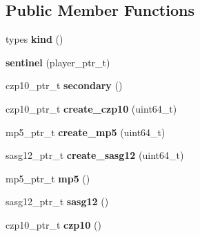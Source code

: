\subsection*{Public Member Functions}
\begin{DoxyCompactItemize}
\item 
\mbox{\label{structmods_1_1classes_1_1sentinel_a949c4bb586c1048c2e80026c322a59a9}} 
types {\bfseries kind} ()
\item 
\mbox{\label{structmods_1_1classes_1_1sentinel_afcf6f192946225af0b540fc562da2660}} 
{\bfseries sentinel} (player\+\_\+ptr\+\_\+t)
\item 
\mbox{\label{structmods_1_1classes_1_1sentinel_a57e665ac50220a0dd2d389bc1eb0948f}} 
czp10\+\_\+ptr\+\_\+t {\bfseries secondary} ()
\item 
\mbox{\label{structmods_1_1classes_1_1sentinel_a175cee9d688ecfdb24b3d4c81b0f4b18}} 
czp10\+\_\+ptr\+\_\+t {\bfseries create\+\_\+czp10} (uint64\+\_\+t)
\item 
\mbox{\label{structmods_1_1classes_1_1sentinel_a7a5172e550a00bb24743c00b903ae646}} 
mp5\+\_\+ptr\+\_\+t {\bfseries create\+\_\+mp5} (uint64\+\_\+t)
\item 
\mbox{\label{structmods_1_1classes_1_1sentinel_a7dcc49958848878b167112eae64a63f7}} 
sasg12\+\_\+ptr\+\_\+t {\bfseries create\+\_\+sasg12} (uint64\+\_\+t)
\item 
\mbox{\label{structmods_1_1classes_1_1sentinel_aee97a4f24083aa12ee2906368cef7e97}} 
mp5\+\_\+ptr\+\_\+t {\bfseries mp5} ()
\item 
\mbox{\label{structmods_1_1classes_1_1sentinel_a6e6fa27fc08f8a294245f1942b1bcdab}} 
sasg12\+\_\+ptr\+\_\+t {\bfseries sasg12} ()
\item 
\mbox{\label{structmods_1_1classes_1_1sentinel_acc66eb324faa846971d782f483c8ff4b}} 
czp10\+\_\+ptr\+\_\+t {\bfseries czp10} ()

\end{DoxyCompactItemize}
